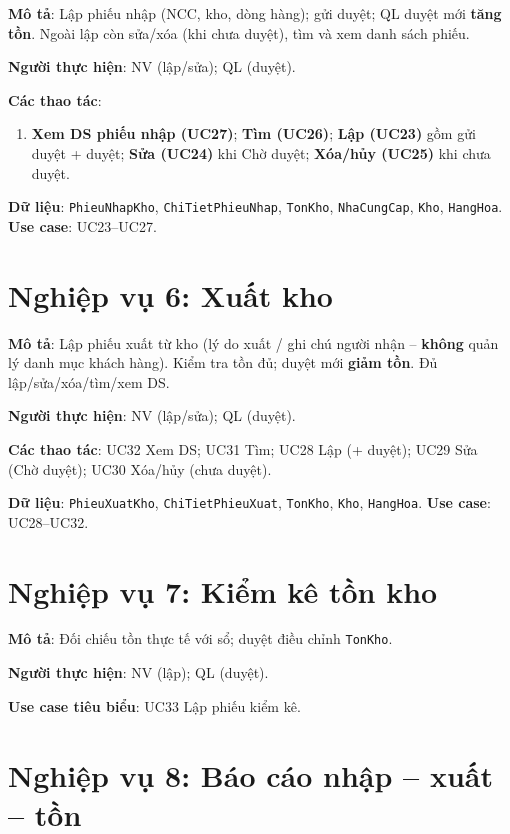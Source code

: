 \textbf{Mô tả}: Lập phiếu nhập (NCC, kho, dòng hàng); gửi duyệt; QL duyệt mới \textbf{tăng tồn}. Ngoài lập còn sửa/xóa (khi chưa duyệt), tìm và xem danh sách phiếu.

\textbf{Người thực hiện}: NV (lập/sửa); QL (duyệt).

\textbf{Các thao tác}:
\begin{enumerate}[leftmargin=1.5cm]
    \item \textbf{Xem DS phiếu nhập (UC27)}; \textbf{Tìm (UC26)}; \textbf{Lập (UC23)} gồm gửi duyệt + duyệt; \textbf{Sửa (UC24)} khi Chờ duyệt; \textbf{Xóa/hủy (UC25)} khi chưa duyệt.
\end{enumerate}

\textbf{Dữ liệu}: \texttt{PhieuNhapKho}, \texttt{ChiTietPhieuNhap}, \texttt{TonKho}, \texttt{NhaCungCap}, \texttt{Kho}, \texttt{HangHoa}. \textbf{Use case}: UC23--UC27.

\section{Nghiệp vụ 6: Xuất kho}

\textbf{Mô tả}: Lập phiếu xuất từ kho (lý do xuất / ghi chú người nhận -- \textbf{không} quản lý danh mục khách hàng). Kiểm tra tồn đủ; duyệt mới \textbf{giảm tồn}. Đủ lập/sửa/xóa/tìm/xem DS.

\textbf{Người thực hiện}: NV (lập/sửa); QL (duyệt).

\textbf{Các thao tác}: UC32 Xem DS; UC31 Tìm; UC28 Lập (+ duyệt); UC29 Sửa (Chờ duyệt); UC30 Xóa/hủy (chưa duyệt).

\textbf{Dữ liệu}: \texttt{PhieuXuatKho}, \texttt{ChiTietPhieuXuat}, \texttt{TonKho}, \texttt{Kho}, \texttt{HangHoa}. \textbf{Use case}: UC28--UC32.

\section{Nghiệp vụ 7: Kiểm kê tồn kho}

\textbf{Mô tả}: Đối chiếu tồn thực tế với sổ; duyệt điều chỉnh \texttt{TonKho}.

\textbf{Người thực hiện}: NV (lập); QL (duyệt).

\textbf{Use case tiêu biểu}: UC33 Lập phiếu kiểm kê.

\section{Nghiệp vụ 8: Báo cáo nhập -- xuất -- tồn}

